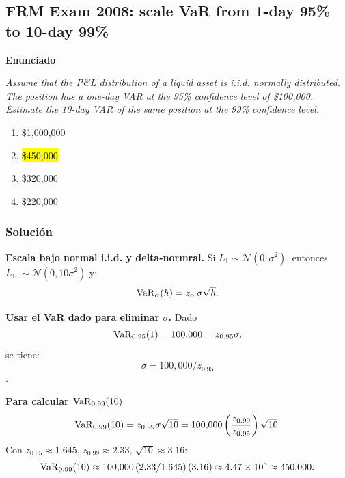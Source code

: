 ﻿\subsection{FRM Exam 2008: scale VaR from 1-day 95\% to 10-day 99\%}

\textbf{Enunciado}

\emph{Assume that the P\&L distribution of a liquid asset is i.i.d. normally distributed. The position has a one-day VAR at the 95\% confidence level of \$100,000. Estimate the 10-day VAR of the same position at the 99\% confidence level.}
\begin{enumerate}[label=\alph*.]
\item \$1,000,000
\item \hl{\$450,000}
\item \$320,000
\item \$220,000
\end{enumerate}

\subsubsection*{Solución}


\textbf{Escala bajo normal i.i.d. y delta-normral. }Si \(L_1\sim\mathcal N(0,\sigma^2)\), entonces \(L_{10}\sim\mathcal N(0,10\sigma^2)\) y:
\[
\mathrm{VaR}_\alpha(h)=z_\alpha\,\sigma\sqrt{h}.
\]

\textbf{Usar el VaR dado para eliminar \(\sigma\). }Dado 
\[\mathrm{VaR}_{0.95}(1)=100{,}000=z_{0.95}\sigma,\]
se tiene:
\[\sigma=100{,}000/z_{0.95}\].

\textbf{Para calcular \(\mathrm{VaR}_{0.99}(10)\)}\\
\[
\mathrm{VaR}_{0.99}(10)=z_{0.99}\sigma\sqrt{10}
=100{,}000\left(\frac{z_{0.99}}{z_{0.95}}\right)\sqrt{10}.
\]
Con \(z_{0.95}\approx 1.645\), \(z_{0.99}\approx 2.33\), \(\sqrt{10}\approx 3.16\):
\[
\mathrm{VaR}_{0.99}(10)\approx 100{,}000\,(2.33/1.645)\,(3.16)\approx 4.47\times 10^5 \approx 450{,}000.
\]












